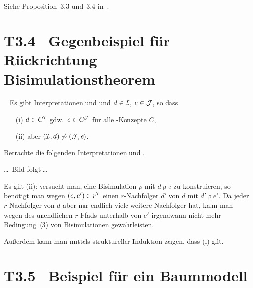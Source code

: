 \documentclass[fontsize=11pt, twoside=false, numbers=autoenddot]{scrbook}
\begin{document}
\par\noindent
\begin{beweis}
  Siehe Proposition~3.3 und~3.4 in~\cite{DLintro}.
\end{beweis}

\goodbreak

\section*{T3.4~ Gegenbeispiel für Rückrichtung Bisimulationstheorem}

~
Es gibt Interpretationen \Imc und \Jmc und $d \in \mathcal{I}$, $e \in \mathcal{J}$, so dass
\begin{enumerate}
  \item[(i)]
    $d \in C^\mathcal{I}$ gdw.\ $e \in C^\mathcal{J}$ für alle \ALC-Konzepte $C$,
  \item[(ii)]
    aber $(\mathcal{I},d) \not\sim (\mathcal{J},e)$.
\end{enumerate}

\par\noindent
\begin{beweis}
  Betrachte die folgenden Interpretationen \Imc und \Jmc.
  \begin{center}
    \dots\ Bild folgt \dots
  \end{center}
  Es gilt (ii):
  versucht man, eine Bisimulation $\rho$ mit $d\mathbin{\rho}e$ zu konstruieren,
  so benötigt man wegen $(e,e') \in r^\mathcal{I}$ einen $r$-Nachfolger $d'$ von $d$
  mit $d' \mathbin{\rho} e'$.
  Da jeder $r$-Nachfolger von $d$ aber nur endlich viele weitere Nachfolger hat,
  kann man wegen des unendlichen $r$-Pfads unterhalb von $e'$
  irgendwann nicht mehr Bedingung~(3) von Bisimulationen gewährleisten.
  
  \parII
  Außerdem kann man mittels struktureller Induktion zeigen, dass (i) gilt.
  \qedhere
\end{beweis}

\section*{T3.5~ Beispiel für ein Baummodell}
\end{document}
